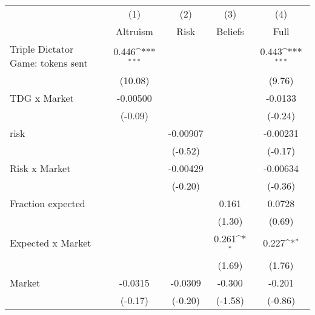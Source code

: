 {
\def\sym#1{\ifmmode^{#1}\else\(^{#1}\)\fi}
\begin{tabular}{l*{4}{c}}
\hline\hline
                    &\multicolumn{1}{c}{(1)}         &\multicolumn{1}{c}{(2)}         &\multicolumn{1}{c}{(3)}         &\multicolumn{1}{c}{(4)}         \\
                    &    Altruism         &        Risk         &     Beliefs         &        Full         \\
\hline
Triple Dictator Game: tokens sent&       0.446\sym{***}&                     &                     &       0.443\sym{***}\\
                    &     (10.08)         &                     &                     &      (9.76)         \\
[1em]
TDG x Market        &    -0.00500         &                     &                     &     -0.0133         \\
                    &     (-0.09)         &                     &                     &     (-0.24)         \\
[1em]
risk                &                     &    -0.00907         &                     &    -0.00231         \\
                    &                     &     (-0.52)         &                     &     (-0.17)         \\
[1em]
Risk x Market       &                     &    -0.00429         &                     &    -0.00634         \\
                    &                     &     (-0.20)         &                     &     (-0.36)         \\
[1em]
Fraction expected   &                     &                     &       0.161         &      0.0728         \\
                    &                     &                     &      (1.30)         &      (0.69)         \\
[1em]
Expected x Market   &                     &                     &       0.261\sym{*}  &       0.227\sym{*}  \\
                    &                     &                     &      (1.69)         &      (1.76)         \\
[1em]
Market              &     -0.0315         &     -0.0309         &      -0.300         &      -0.201         \\
                    &     (-0.17)         &     (-0.20)         &     (-1.58)         &     (-0.86)         \\

\end{tabular}}
